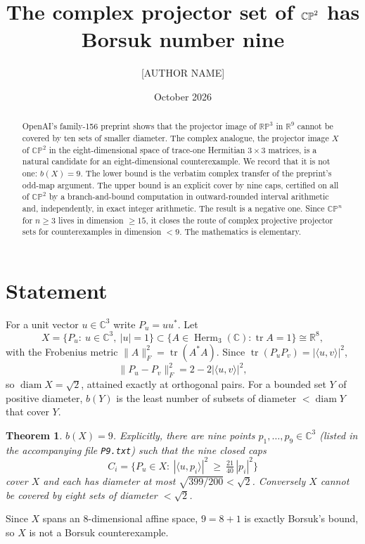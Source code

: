 \documentclass[11pt]{amsart}
\title{The complex projector set of $\CP^2$ has Borsuk number nine}
\author{[AUTHOR NAME]}
\date{October 2026}
\newtheorem{theorem}{Theorem}
\theoremstyle{remark}
\newcommand{\C}{\mathbb C}
\newcommand{\R}{\mathbb R}
\newcommand{\CP}{\mathbb{CP}}
\DeclareMathOperator{\tr}{tr}
\DeclareMathOperator{\Herm}{Herm}
\DeclareMathOperator{\diam}{diam}
\begin{document}
\begin{abstract}
OpenAI's family-156 preprint shows that the projector image of $\mathbb{RP}^3$ in
$\R^9$ cannot be covered by ten sets of smaller diameter. The complex analogue,
the projector image $X$ of $\CP^2$ in the eight-dimensional space of trace-one
Hermitian $3\times3$ matrices, is a natural candidate for an eight-dimensional
counterexample. We record that it is not one: $b(X)=9$. The lower bound is the
verbatim complex transfer of the preprint's odd-map argument. The upper bound
is an explicit cover by nine caps, certified on all of $\CP^2$ by a
branch-and-bound computation in outward-rounded interval arithmetic and,
independently, in exact integer arithmetic. The result is a negative one. Since $\CP^n$ for
$n\ge3$ lives in dimension $\ge15$, it closes the route of complex projective
projector sets for counterexamples in dimension $<9$. The mathematics is elementary.
\end{abstract}
\maketitle

\section{Statement}
For a unit vector $u\in\C^3$ write $P_u=uu^*$. Let
\[
 X=\{P_u:\ u\in\C^3,\ |u|=1\}\subset\{A\in\Herm_3(\C):\tr A=1\}\cong\R^8,
\]
with the Frobenius metric $\|A\|_F^2=\tr(A^*A)$. Since $\tr(P_uP_v)=|\langle u,v\rangle|^2$,
\begin{equation}\label{eq:dist}
 \|P_u-P_v\|_F^2=2-2|\langle u,v\rangle|^2 ,
\end{equation}
so $\diam X=\sqrt2$, attained exactly at orthogonal pairs. For a bounded set $Y$ of positive diameter, $b(Y)$ is the least number of subsets of
diameter $<\diam Y$ that cover $Y$.

\begin{theorem}\label{thm:main}
$b(X)=9$. Explicitly, there are nine points $p_1,\dots,p_9\in\C^3$ (listed in
the accompanying file \texttt{P9.txt}) such that the nine closed caps
\[
 C_i=\Big\{P_u\in X:\ |\langle u,p_i\rangle|^2\ \ge\ \tfrac{21}{40}\,|p_i|^2\Big\}
\]
cover $X$ and each has diameter at most $\sqrt{399/200}<\sqrt2$. Conversely
$X$ cannot be covered by eight sets of diameter $<\sqrt2$.
\end{theorem}

Since $X$ spans an $8$-dimensional affine space, $9=8+1$ is exactly Borsuk's
bound, so $X$ is not a Borsuk counterexample.
\end{document}
